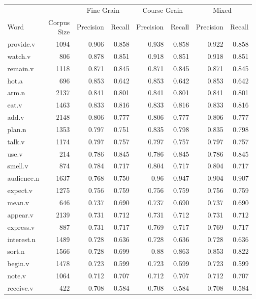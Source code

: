 \documentclass{article}
\begin{document}
\begin{longtable}{l | r r r r r r r}
		&	&	\multicolumn{2}{c}{Fine Grain}	&	\multicolumn{2}{c}{Course Grain}	&	\multicolumn{2}{c}{Mixed}\\
Word	&	Corpus Size	&	Precision	&	Recall	&	Precision	&	Recall	&	Precision	&	Recall\\
\hline
provide.v   	&	1094	&	0.906	&	0.858	&	0.938	&	0.858	&	0.922	&	0.858\\
watch.v     	&	806 	&	0.878	&	0.851	&	0.918	&	0.851	&	0.918	&	0.851\\
remain.v    	&	1118	&	0.871	&	0.845	&	0.871	&	0.845	&	0.871	&	0.845\\
hot.a       	&	696 	&	0.853	&	0.642	&	0.853	&	0.642	&	0.853	&	0.642\\
arm.n       	&	2137	&	0.841	&	0.801	&	0.841	&	0.801	&	0.841	&	0.801\\
eat.v       	&	1463	&	0.833	&	0.816	&	0.833	&	0.816	&	0.833	&	0.816\\
add.v       	&	2148	&	0.806	&	0.777	&	0.806	&	0.777	&	0.806	&	0.777\\
plan.n      	&	1353	&	0.797	&	0.751	&	0.835	&	0.798	&	0.835	&	0.798\\
talk.v      	&	1174	&	0.797	&	0.757	&	0.797	&	0.757	&	0.797	&	0.757\\
use.v       	&	214 	&	0.786	&	0.845	&	0.786	&	0.845	&	0.786	&	0.845\\
smell.v     	&	874 	&	0.784	&	0.717   &	0.804	&	0.717   &	0.804	&	0.717\\
audience.n    	&	1637	&	0.768	&	0.750	&	0.96	&	0.947	&	0.904	&	0.907\\
expect.v    	&	1275	&	0.756	&	0.759	&	0.756	&	0.759	&	0.756	&	0.759\\
mean.v      	&	646 	&	0.737	&	0.690	&	0.737	&	0.690	&	0.737	&	0.690\\
appear.v    	&	2139	&	0.731	&	0.712	&	0.731	&	0.712	&	0.731	&	0.712\\
express.v    	&	887 	&	0.731	&	0.717   &	0.769	&	0.717   &	0.769	&	0.717\\
interest.n    	&	1489	&	0.728	&	0.636	&	0.728	&	0.636	&	0.728	&	0.636\\
sort.n      	&	1566	&	0.728	&	0.699	&	0.88	&	0.863	&	0.853	&	0.822\\
begin.v     	&	1478	&	0.723	&	0.599	&	0.723	&	0.599	&	0.723	&	0.599\\
note.v      	&	1064	&	0.712	&	0.707	&	0.712	&	0.707	&	0.712	&	0.707\\
receive.v    	&	422 	&	0.708	&	0.584	&	0.708	&	0.584	&	0.708	&	0.584\\

\end{longtable}
\end{document}
